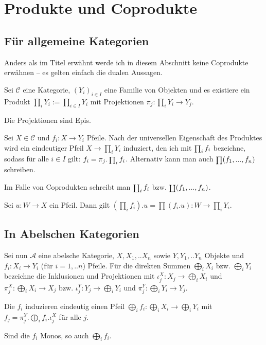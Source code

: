 \section{Produkte und Coprodukte}

\subsection{Für allgemeine Kategorien}

Anders als im Titel erwähnt werde ich in diesem Abschnitt keine Coprodukte erwähnen -- es gelten einfach die dualen Aussagen.

Sei $\mathcal C$ eine Kategorie, $(Y_i)_{i\in I}$ eine Familie von Objekten und es existiere ein Produkt $\prod_i Y_i := \prod_{i\in I} Y_i$ mit Projektionen $\pi_j : \prod_i Y_i \to Y_j$.

\begin{prop} Die Projektionen sind Epis.
\end{prop}

Sei $X\in \mathcal C$ und $f_i : X \to Y_i$ Pfeile. Nach der universellen Eigenschaft des Produktes wird ein eindeutiger Pfeil $X \to \prod_i Y_i$ induziert, den ich mit $\operatorname{\scriptstyle\prod}_i f_i$ bezeichne, sodass für alle $i\in I$ gilt: $f_i = \pi_j . \operatorname{\scriptstyle\prod}_i f_i$. Alternativ kann man auch $\operatorname{\scriptstyle\prod}(f_1,...,f_n)$ schreiben.

Im Falle von Coprodukten schreibt man $\operatorname{\scriptstyle\coprod}_i f_i$ bzw. $\operatorname{\scriptstyle\coprod}(f_1,...,f_n)$.

\begin{prop} Sei $u : W \to X$ ein Pfeil. Dann gilt $(\prod_i f_i) . u = \prod (f_i . u): W \to \prod_i Y_i$.
\end{prop}


\subsection{In Abelschen Kategorien}

Sei nun $\mathcal A$ eine abelsche Kategorie, $X,X_1,..X_n$ sowie $Y,Y_1,..Y_n$ Objekte und $f_i : X_i \to Y_i$ (für $i = 1,..n$) Pfeile.
Für die direkten Summen $\bigoplus_i X_i$ bzw. $\bigoplus_i Y_i$ bezeichne die Inklusionen und Projektionen mit $\iota^X_j : X_j \to \bigoplus_i X_i$ und $\pi^X_j : \bigoplus_i X_i \to X_j$ bzw. $\iota^Y_j : Y_j \to \bigoplus_i Y_i$ und $\pi^Y_j : \bigoplus_i Y_i \to Y_j$.

\begin{prop} Die $f_i$ induzieren eindeutig einen Pfeil $\bigoplus_i f_i : \bigoplus_i X_i \to \bigoplus_i Y_i$ mit $f_j = \pi^Y_j . \bigoplus_i f_i . \iota^X_j$ für alle $j$.
\end{prop}

\begin{prop} Sind die $f_i$ Monos, so auch $\bigoplus_i f_i$.
\end{prop}
